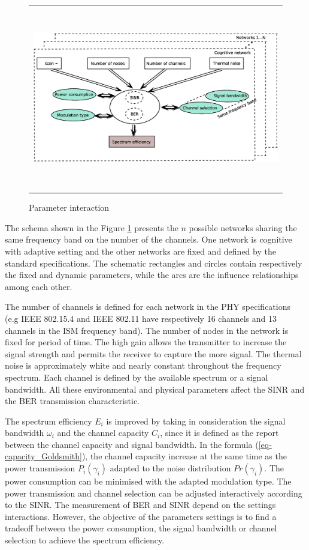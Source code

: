 \documentclass[conference]{IEEEtran}
\begin{document}
\begin{figure}[!t]
\begin{center}
\begin{tabular}{c}
\label{fig-1}
\includegraphics[height=8cm,width=15cm]{Figures/fig-1bis.eps}\\
\end{tabular}
\caption{Parameter interaction} \label{fig-1}
\end{center}
\end{figure}
 
The schema shown in the Figure \ref{fig-1} presents the $n$ possible networks sharing the same frequency band on the number of the channels. One network is cognitive with adaptive setting and the other networks are fixed and defined by the standard specifications. The schematic rectangles and circles contain respectively the fixed and dynamic parameters, while the arcs are the influence relationships among each other. 

The number of channels is defined for each network in the PHY specifications (e.g IEEE 802.15.4 and IEEE 802.11 have respectively 16 channels and 13 channels in the ISM frequency band). The number of nodes in the network is fixed for period of time. The high gain allows the transmitter to increase the signal strength and permits the receiver to capture the more signal. The thermal noise is approximately white and nearly constant throughout the frequency spectrum. Each channel is defined by the available spectrum or a signal bandwidth. All these environmental and physical parameters affect the SINR and the BER transmission characteristic. 

The spectrum efficiency $E_{i}$ is improved by taking in consideration the signal bandwidth $\omega_{i}$ and the channel capacity $C_{i}$, since it is defined as the report between the channel capacity and signal bandwidth. In the formula (\ref{eq-capacity_Goldsmith}), the channel capacity increase at the same time as the power transmission $P_{i}(\gamma_{i})$ adapted to the noise distribution $Pr(\gamma_{i})$. The power consumption can be minimised with the adapted modulation type. The power transmission and channel selection can be adjusted interactively according to the SINR. The measurement of BER and SINR depend on the settings interactions. However, the objective of the parameters settings is to find a tradeoff between the power consumption, the signal bandwidth or channel selection to achieve the spectrum efficiency.
\end{document}
